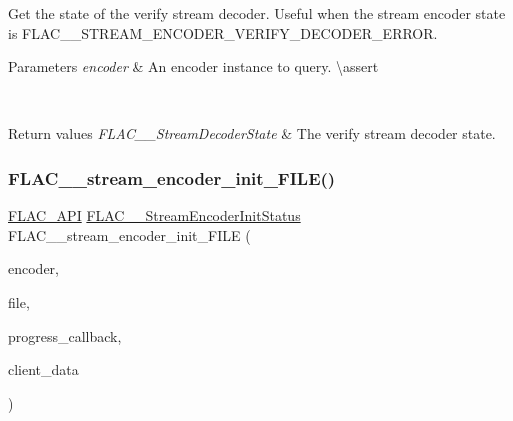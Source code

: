 Get the state of the verify stream decoder. Useful when the stream encoder state is {\ttfamily F\+L\+A\+C\+\_\+\+\_\+\+S\+T\+R\+E\+A\+M\+\_\+\+E\+N\+C\+O\+D\+E\+R\+\_\+\+V\+E\+R\+I\+F\+Y\+\_\+\+D\+E\+C\+O\+D\+E\+R\+\_\+\+E\+R\+R\+OR}.


\begin{DoxyParams}{Parameters}
{\em encoder} & An encoder instance to query. \textbackslash{}assert 
\begin{DoxyCode}{1}
\end{DoxyCode}
 \\
\hline
\end{DoxyParams}

\begin{DoxyRetVals}{Return values}
{\em F\+L\+A\+C\+\_\+\+\_\+\+Stream\+Decoder\+State} & The verify stream decoder state. \\
\hline
\end{DoxyRetVals}
\mbox{\label{group__flac__stream__encoder_ga78653fea5d9bc490fff34e3ef86de944}} 
\subsubsection{\texorpdfstring{FLAC\_\_stream\_encoder\_init\_FILE()}{FLAC\_\_stream\_encoder\_init\_FILE()}}
{\footnotesize\ttfamily \mbox{\hyperlink{group__flac__export_ga56ca07df8a23310707732b1c0007d6f5}{F\+L\+A\+C\+\_\+\+A\+PI}} \mbox{\hyperlink{group__flac__stream__encoder_ga3bb869620af2b188d77982a5c30b047d}{F\+L\+A\+C\+\_\+\+\_\+\+Stream\+Encoder\+Init\+Status}} F\+L\+A\+C\+\_\+\+\_\+stream\+\_\+encoder\+\_\+init\+\_\+\+F\+I\+LE (\begin{DoxyParamCaption}\item[{\mbox{\hyperlink{struct_f_l_a_c_____stream_encoder}{F\+L\+A\+C\+\_\+\+\_\+\+Stream\+Encoder}} $\ast$}]{encoder,  }\item[{F\+I\+LE $\ast$}]{file,  }\item[{\mbox{\hyperlink{group__flac__stream__encoder_ga6e051c0e5837433f9e7cd56cd42ca6ba}{F\+L\+A\+C\+\_\+\+\_\+\+Stream\+Encoder\+Progress\+Callback}}}]{progress\+\_\+callback,  }\item[{\mbox{\hyperlink{_s_d_l__opengles2__gl2ext_8h_ae5d8fa23ad07c48bb609509eae494c95}{void}} $\ast$}]{client\+\_\+data }\end{DoxyParamCaption})}

